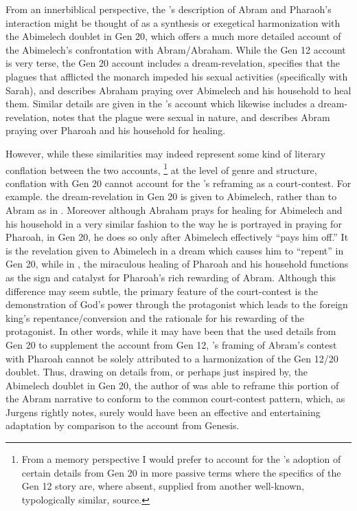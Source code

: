 From an innerbiblical perspective, the \ga's description of Abram and Pharaoh's interaction might be thought of as a synthesis or exegetical harmonization with the Abimelech doublet in Gen 20, which offers a much more detailed account of the Abimelech's confrontation with Abram/Abraham. %
While the Gen 12 account is very terse, the Gen 20 account includes a dream-revelation, specifies that the plagues that afflicted the monarch impeded his sexual activities (specifically with Sarah), and describes Abraham praying over Abimelech and his household to heal them. Similar details are given in the \ga's account which likewise includes a dream-revelation, notes that the plague were sexual in nature, and describes Abram praying over Pharoah and his household for healing. 

However, while these similarities may indeed represent some kind of literary conflation between the two accounts,%
%
\footnote{From a memory perspective I would prefer to account for the \ga's adoption of certain details from Gen 20 in more passive terms where the specifics of the Gen 12 story are, where absent, supplied from another well-known, typologically similar, source. %
} 
%
at the level of genre and structure, conflation with Gen 20 cannot account for the \ga's reframing as a court-contest. For example. the dream-revelation in Gen 20 is given to Abimelech, rather than to Abram as in \ga. Moreover although Abraham prays for healing for Abimelech and his household in a very similar fashion to the way he is portrayed in \ga praying for Pharoah, in Gen 20, he does so only after Abimelech effectively ``pays him off.'' It is the revelation given to Abimelech in a dream which causes him to ``repent'' in Gen 20, while in \ga, the miraculous healing of Pharoah and his household functions as the sign and catalyst for Pharoah's rich rewarding of Abram. Although this difference may seem subtle, the primary feature of the court-contest is the demonstration of God's power through the protagonist which leads to the foreign king's repentance/conversion and the rationale for his rewarding of the protagonist. In other words, while it may have been that the \ga used details from Gen 20 to supplement the account from Gen 12, \ga's framing of Abram's contest with Pharoah cannot be solely attributed to a harmonization of the Gen 12/20 doublet. Thus, drawing on details from, or perhaps just inspired by, the Abimelech doublet in Gen 20, the author of \ga was able to reframe this portion of the Abram narrative to conform to the common court-contest pattern, which, as Jurgens rightly notes, surely would have been an effective and entertaining adaptation by comparison to the account from Genesis.

